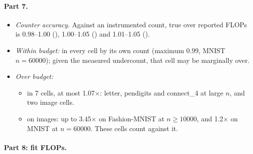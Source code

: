 \paragraph{Part 7.}
\begin{itemize}
\item \emph{Counter accuracy.} Against an instrumented count, true over reported FLOPs is 0.98--1.00 (), 1.00--1.05 () and 1.01--1.05 ().
\item \emph{Within budget:}  in every cell by its own count (maximum 0.99, MNIST $n=60000$); given the measured undercount, that cell may be marginally over.
\item \emph{Over budget:}
  \begin{itemize}
  \item {} in 7 cells, at most 1.07$\times$: letter, pendigits and connect\_4 at large $n$, and two image cells.
  \item {} on images: up to 3.45$\times$ on Fashion-MNIST at $n\ge10000$, and 1.2$\times$ on MNIST at $n=60000$. These cells count against it.
  \end{itemize}
\end{itemize}

\paragraph{Part 8: fit FLOPs.}

